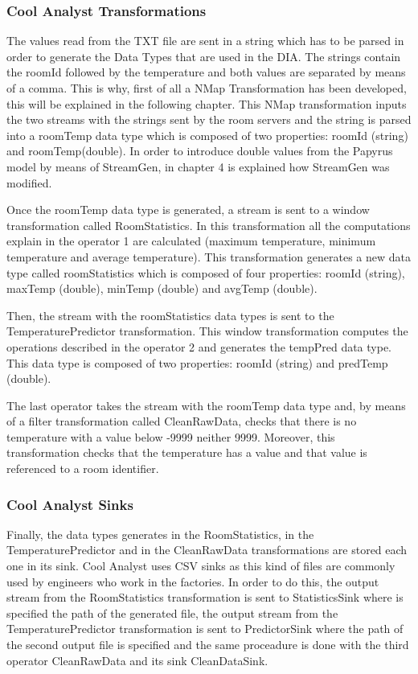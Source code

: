 \subsubsection*{Cool Analyst Transformations}

The values read from the TXT file are sent in a string which has to be parsed in order to generate the Data Types that are used in the DIA. The strings contain the roomId followed by the temperature and both values are separated by means of a comma. This is why, first of all a NMap Transformation has been developed, this will be explained in the following chapter. This NMap transformation inputs the two streams with the strings sent by the room servers and the string is parsed into a roomTemp data type which is composed of two properties: roomId (string) and roomTemp(double). In order to introduce double values from the Papyrus model by means of StreamGen, in chapter 4 is explained how StreamGen was modified.

Once the roomTemp data type is generated, a stream is sent to a window transformation called RoomStatistics. In this transformation all the computations explain in the operator 1 are calculated (maximum temperature, minimum temperature and average temperature). This transformation generates a new data type called roomStatistics which is composed of four properties: roomId (string), maxTemp (double), minTemp (double) and avgTemp (double).

Then, the stream with the roomStatistics data types is sent to the TemperaturePredictor transformation. This window transformation computes the operations described in the operator 2 and generates the tempPred data type. This data type is composed of two properties: roomId (string) and predTemp (double).

The last operator takes the stream with the roomTemp data type and, by means of a filter transformation called CleanRawData, checks that there is no temperature with a value below -9999 neither 9999. Moreover, this transformation checks that the temperature has a value and that value is referenced to a room identifier.

\subsubsection*{Cool Analyst Sinks}

Finally, the data types generates in the RoomStatistics, in the TemperaturePredictor and in the CleanRawData transformations are stored each one in its sink. Cool Analyst uses CSV sinks as this kind of files are commonly used by engineers who work in the factories. In order to do this, the output stream from the RoomStatistics transformation is sent to StatisticsSink where is specified the path of the generated file, the output stream from the TemperaturePredictor transformation is sent to PredictorSink where the path of the second output file is specified and the same proceadure is done with the third operator CleanRawData and its sink CleanDataSink.

